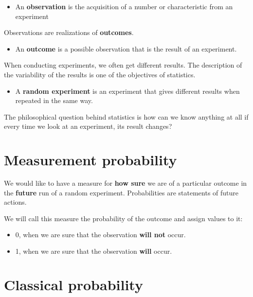 \documentclass[
]{book}
\providecommand{\tightlist}{%
  \setlength{\itemsep}{0pt}\setlength{\parskip}{0pt}}
\begin{document}
\begin{itemize}
\tightlist
\item
  An \textbf{observation} is the acquisition of a number or characteristic from an experiment
\end{itemize}

Observations are realizations of \textbf{outcomes}.

\begin{itemize}
\tightlist
\item
  An \textbf{outcome} is a possible observation that is the result of an experiment.
\end{itemize}

When conducting experiments, we often get different results. The description of the variability of the results is one of the objectives of statistics.

\begin{itemize}
\tightlist
\item
  A \textbf{random experiment} is an experiment that gives different results when repeated in the same way.
\end{itemize}

The philosophical question behind statistics is how can we know anything at all if every time we look at an experiment, its result changes?

\hypertarget{measurement-probability}{%
\section{Measurement probability}\label{measurement-probability}}

We would like to have a measure for \textbf{how sure} we are of a particular outcome in the \textbf{future} run of a random experiment. Probabilities are statements of future actions.

We will call this measure the probability of the outcome and assign values to it:

\begin{itemize}
\item
  0, when we are sure that the observation \textbf{will not} occur.
\item
  1, when we are sure that the observation \textbf{will} occur.
\end{itemize}

\hypertarget{classical-probability}{%
\section{Classical probability}\label{classical-probability}}
\end{document}
